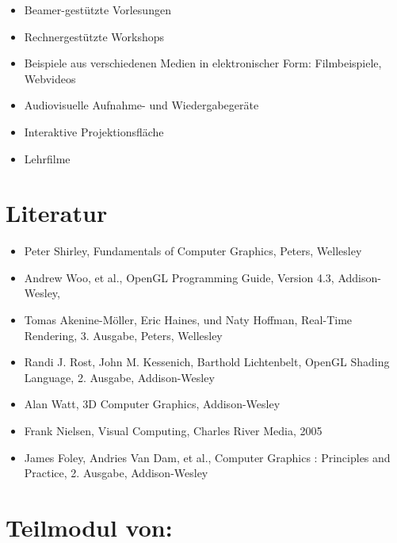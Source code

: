 \begin{itemize}
\tightlist
\item
  Beamer-gestützte Vorlesungen
\item
  Rechnergestützte Workshops
\item
  Beispiele aus verschiedenen Medien in elektronischer Form:
  Filmbeispiele, Webvideos
\item
  Audiovisuelle Aufnahme- und Wiedergabegeräte
\item
  Interaktive Projektionsfläche
\item
  Lehrfilme
\end{itemize}

\hypertarget{literaturpathlabelmi-2017modulbeschreibungen-bachelorba_vc-computergrafik-und-animation}{%
\section*{Literatur\label{/mi-2017/modulbeschreibungen-bachelor/BA_VC-computergrafik-und-animation}}\label{literaturpathlabelmi-2017modulbeschreibungen-bachelorba_vc-computergrafik-und-animation}}

\begin{itemize}
\tightlist
\item
  Peter Shirley, Fundamentals of Computer Graphics, Peters, Wellesley
\item
  Andrew Woo, et al., OpenGL Programming Guide, Version 4.3,
  Addison-Wesley,
\item
  Tomas Akenine-Möller, Eric Haines, und Naty Hoffman, Real-Time
  Rendering, 3. Ausgabe, Peters, Wellesley
\item
  Randi J. Rost, John M. Kessenich, Barthold Lichtenbelt, OpenGL Shading
  Language, 2. Ausgabe, Addison-Wesley
\item
  Alan Watt, 3D Computer Graphics, Addison-Wesley
\item
  Frank Nielsen, Visual Computing, Charles River Media, 2005
\item
  James Foley, Andries Van Dam, et al., Computer Graphics : Principles
  and Practice, 2. Ausgabe, Addison-Wesley
\end{itemize}

\hypertarget{teilmodul-vonpathlabelmi-2017modulbeschreibungen-bachelorba_vc-computergrafik-und-animation}{%
\section*{Teilmodul
von:\label{/mi-2017/modulbeschreibungen-bachelor/BA_VC-computergrafik-und-animation}}\label{teilmodul-vonpathlabelmi-2017modulbeschreibungen-bachelorba_vc-computergrafik-und-animation}}


